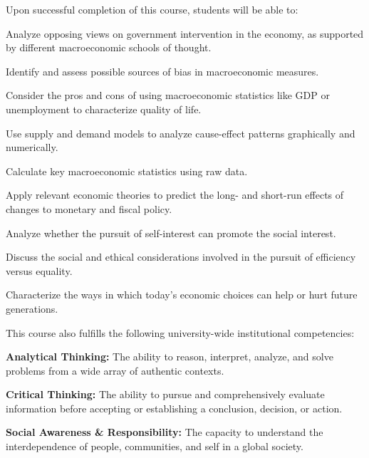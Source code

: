 Upon successful completion of this course, students will be able to:
\begin{ul}
    \item Analyze opposing views on government intervention in the economy, as supported by different macroeconomic schools of thought.
    \item Identify and assess possible sources of bias in macroeconomic measures.
    \item Consider the pros and cons of using macroeconomic statistics like GDP or unemployment to characterize quality of life.
    \item Use supply and demand models to analyze cause-effect patterns graphically and numerically.
    \item Calculate key macroeconomic statistics using raw data.
    \item Apply relevant economic theories to predict the long- and short-run effects of changes to monetary and fiscal policy.
    \item Analyze whether the pursuit of self-interest can promote the social interest.
    \item Discuss the social and ethical considerations involved in the pursuit of efficiency versus equality.
    \item Characterize the ways in which today's economic choices can help or hurt future generations.
\end{ul}

This course also fulfills the following university-wide institutional competencies:
\begin{ul}
    \item \textbf{Analytical Thinking:} The ability to reason, interpret, analyze, and solve problems from a wide array of authentic contexts.
    \item \textbf{Critical Thinking:} The ability to pursue and comprehensively evaluate information before accepting or establishing a conclusion, decision, or action.
    \item \textbf{Social Awareness \& Responsibility:} The capacity to understand the interdependence of people, communities, and self in a global society.
\end{ul}
